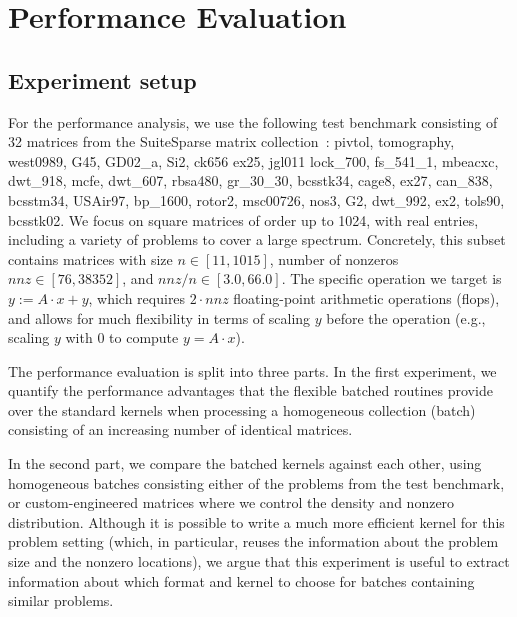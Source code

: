 \section{Performance Evaluation}
\label{2017-batched-spmv:sec:s4-experiments}

\subsection{Experiment setup}
For the performance analysis, we use the following test benchmark consisting of 32 matrices from the
SuiteSparse matrix collection~\cite{ufmc}: 
{\sc pivtol}, {\sc tomography},
{\sc west0989}, {\sc G45}, 
{\sc GD02\_a}, {\sc Si2},
{\sc ck656} {\sc ex25}, 
{\sc jgl011} {\sc lock\_700}, 
{\sc fs\_541\_1}, {\sc mbeacxc}, 
{\sc dwt\_918}, {\sc mcfe}, 
{\sc dwt\_607}, {\sc rbsa480}, 
{\sc gr\_30\_30}, {\sc bcsstk34}, 
{\sc cage8}, {\sc ex27}, 
{\sc can\_838}, {\sc bcsstm34}, 
{\sc USAir97}, {\sc bp\_1600}, 
{\sc rotor2}, {\sc msc00726}, 
{\sc nos3}, {\sc G2}, 
{\sc dwt\_992}, {\sc ex2},
\linebreak
{\sc tols90}, {\sc bcsstk02}. 
We focus on square matrices of order up to 1024, 
with real entries,
including a variety of problems
to cover a large spectrum.
Concretely, this subset contains matrices with size $n \in [11,1015]$, number of nonzeros
$nnz \in [76,38352]$, and $nnz/n \in [3.0,66.0]$.
The specific operation we target is $y := A\cdot x + y$,
which requires $2\cdot nnz$ floating-point arithmetic operations (flops),
and allows for much flexibility in terms of scaling $y$ before the
operation (e.g., scaling $y$ with 0 to compute $y=A\cdot x$).

The performance evaluation is split into three parts. 
In the first experiment, we quantify the performance advantages that the 
flexible batched routines provide
over the standard \spmv kernels when processing a homogeneous collection 
(batch) consisting
of an increasing number of identical matrices.

In the second part, we compare the batched kernels against each other, using 
homogeneous batches consisting either of the problems from the test benchmark, 
or custom-engineered matrices where we control the density and
nonzero distribution.
Although it is possible to write a much more efficient kernel for this 
problem setting (which, in particular, reuses the information about the problem 
size and the nonzero locations),
we argue that this experiment is useful to extract information about which 
format and kernel
to choose for batches containing similar problems.

